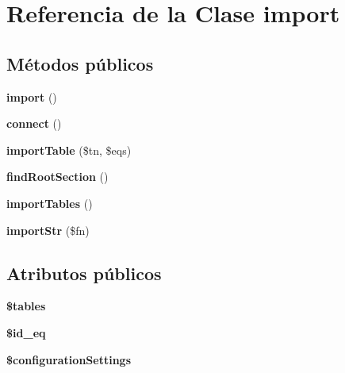 \hypertarget{classimport}{\section{\-Referencia de la \-Clase import}
\label{classimport}
}
\subsection*{\-Métodos públicos}
\begin{DoxyCompactItemize}
\item 
\hypertarget{classimport_a2c5438f4bf08ebd69e0675cb56f8f04e}{{\bfseries import} ()}\label{classimport_a2c5438f4bf08ebd69e0675cb56f8f04e}

\item 
\hypertarget{classimport_a981c9e22a3d8c43548a62af334841e4a}{{\bfseries connect} ()}\label{classimport_a981c9e22a3d8c43548a62af334841e4a}

\item 
\hypertarget{classimport_ae689e36a8b4bc859a2bdf953af65d9a4}{{\bfseries import\-Table} (\$tn, \$eqs)}\label{classimport_ae689e36a8b4bc859a2bdf953af65d9a4}

\item 
\hypertarget{classimport_a79aec3c65f5939766d8bdf59de9037c7}{{\bfseries find\-Root\-Section} ()}\label{classimport_a79aec3c65f5939766d8bdf59de9037c7}

\item 
\hypertarget{classimport_abf37e24a7103afa8b9aa3e2ebde97d37}{{\bfseries import\-Tables} ()}\label{classimport_abf37e24a7103afa8b9aa3e2ebde97d37}

\item 
\hypertarget{classimport_aee27bb889c83b03228c6c4337cdcf5de}{{\bfseries import\-Str} (\$fn)}\label{classimport_aee27bb889c83b03228c6c4337cdcf5de}

\end{DoxyCompactItemize}
\subsection*{\-Atributos públicos}
\begin{DoxyCompactItemize}
\item 
\hypertarget{classimport_a44e9f11d7a5e167bd09b09d8fe090b1e}{{\bfseries \$tables}}\label{classimport_a44e9f11d7a5e167bd09b09d8fe090b1e}

\item 
\hypertarget{classimport_a508b999d03da21afcbbe2f4a0f28a292}{{\bfseries \$id\-\_\-eq}}\label{classimport_a508b999d03da21afcbbe2f4a0f28a292}

\item 
\hypertarget{classimport_a23438816c4c0d0e6aa3cd83f6224c8f1}{{\bfseries \$configuration\-Settings}}\label{classimport_a23438816c4c0d0e6aa3cd83f6224c8f1}

\end{DoxyCompactItemize}


